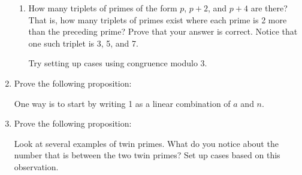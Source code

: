 \begin{enumerate}
\begin{enumerate}
\item How many triplets of primes of the form $p$, $p+2$, and $p+4$ are there?  That is, how many triplets of primes exist where each prime is 2 more than the preceding prime?  Prove that your answer is correct.  Notice that one such triplet is 3, 5, and 7.

\hint  Try setting up cases using congruence modulo 3.

\end{enumerate}

\item Prove the following proposition:

\hint  One way is to start by writing 1 as a linear combination of $a$ and $n$.

\item  Prove the following proposition: \label{exer:sec82-twinprimes}

\hint  Look at several examples of twin primes.  What do you  notice about the number that is between the two twin primes?  Set up cases based on this observation.

\end{enumerate}




\hbreak

